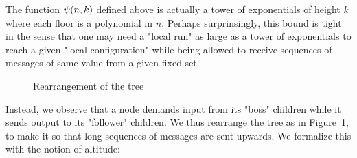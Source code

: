 \begin{remark}
The function $\psi(n,k)$ defined above is actually a tower of exponentials of height $k$ where each floor is a polynomial in $n$. Perhaps surprinsingly, this bound is tight in the sense that one may need a "local run" as large as a tower of exponentials to reach a given "local configuration" while being allowed to receive sequences of messages of same value from a given fixed set. 
\end{remark}


\begin{figure}[h]
	
	\caption{Rearrangement of the tree}
	\label{fig:rearrange-tree}
\end{figure}


Instead, we observe that a node demands input from its "boss" children while it sends output to its "follower" children. We thus rearrange the tree as in Figure~\ref{fig:rearrange-tree}, to make it so that long sequences of messages are sent upwards. We formalize this with the notion of altitude:



